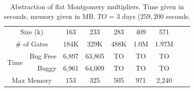 \begin{table}[hbt]
\begin{center}
{\small
\caption{Abstraction of flat Montgomery multipliers. Time given in seconds, memory given in MB. $TO$ = $3$ days ($259,200$ seconds.}
\label{tbl:montFlatToolResults}
\begin{tabular}{|l|r|c|c|c|c|c|c|c|} 
\hline
\multicolumn{2}{|c|}{Size (k)}      &  163  &     233 &     283 &     409 & 571 \\
\multicolumn{2}{|c|}{\# of Gates}   & 184K  &    329K &    488K &    1.0M & 1.97M \\
\hline
\multirow{2}{*}{Time} & Bug Free &   6,897  &  63,805 &  TO & TO  &   TO \\
                      & Buggy    &   6,961  &  64,009 &  TO & TO  &   TO      \\
\hline
\multicolumn{2}{|c|}{Max Memory} &     153  &     325 &     505 &    971  &   2,240   \\
\hline
\end{tabular}
}
\end{center}
\vspace{-0.15in}
\end{table}

